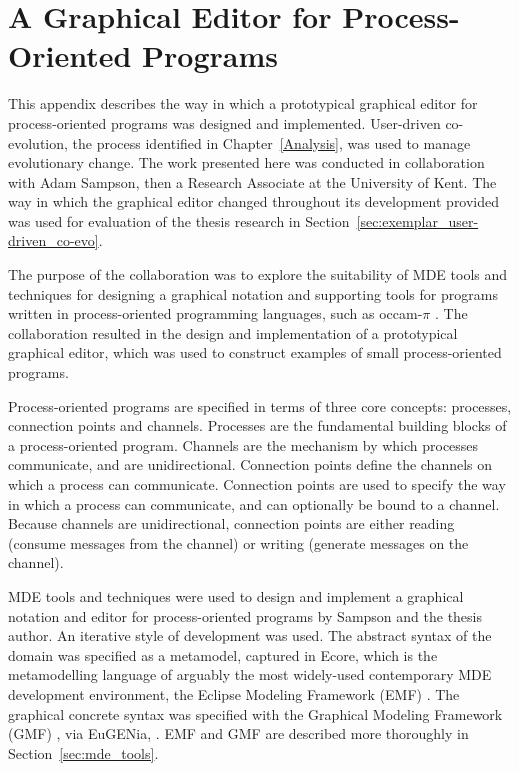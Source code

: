 
\chapter[A Graphical Editor for Process-Oriented Programs][An Exemplar Graphical Model Editor]{A Graphical Editor for Process-Oriented Programs}
\label{ProcessOriented}

This appendix describes the way in which a prototypical graphical editor for process-oriented programs was designed and implemented. User-driven co-evolution, the process identified in Chapter~\ref{Analysis}, was used to manage evolutionary change. The work presented here was conducted in collaboration with Adam Sampson, then a Research Associate at the University of Kent. The way in which the graphical editor changed throughout its development provided was used for evaluation of the thesis research in Section~\ref{sec:exemplar_user-driven_co-evo}.

The purpose of the collaboration was to explore the suitability of MDE tools and techniques for designing a graphical notation and supporting tools for programs written in process-oriented programming languages, such as occam-$\pi$ \cite{occam_pi}. The collaboration resulted in the design and implementation of a prototypical graphical editor, which was used to construct examples of small process-oriented programs.

Process-oriented programs are specified in terms of three core concepts: processes, connection points and channels. Processes are the fundamental building blocks of a process-oriented program. Channels are the mechanism by which processes communicate, and are unidirectional. Connection points define the channels on which a process can communicate. Connection points are used to specify the way in which a process can communicate, and can optionally be bound to a channel. Because channels are unidirectional, connection points are either reading (consume messages from the channel) or writing (generate messages on the channel).

MDE tools and techniques were used to design and implement a graphical notation and editor for process-oriented programs by Sampson and the thesis author. An iterative style of development was used. The abstract syntax of the domain was specified as a metamodel, captured in Ecore, which is the metamodelling language of arguably the most widely-used contemporary MDE development environment, the Eclipse Modeling Framework (EMF) \cite{steinberg09emf}. The graphical concrete syntax was specified with the Graphical Modeling Framework (GMF) \cite{gronback06gmf}, via EuGENia, \cite{kolovos09eugenia}. EMF and GMF are described more thoroughly in Section~\ref{sec:mde_tools}.


